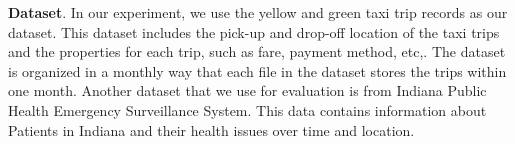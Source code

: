 {\bf Dataset}. 
In our experiment, we use the yellow and green taxi trip records as our dataset. 
This dataset includes the pick-up and drop-off location of the taxi trips and the properties for each trip, such as fare, payment method, etc,. The dataset is organized in a monthly way that each file in the dataset stores the trips within one month.
Another dataset that we use for evaluation is from Indiana Public Health Emergency Surveillance System. This data contains information about Patients in Indiana and their health issues over time and location. 



